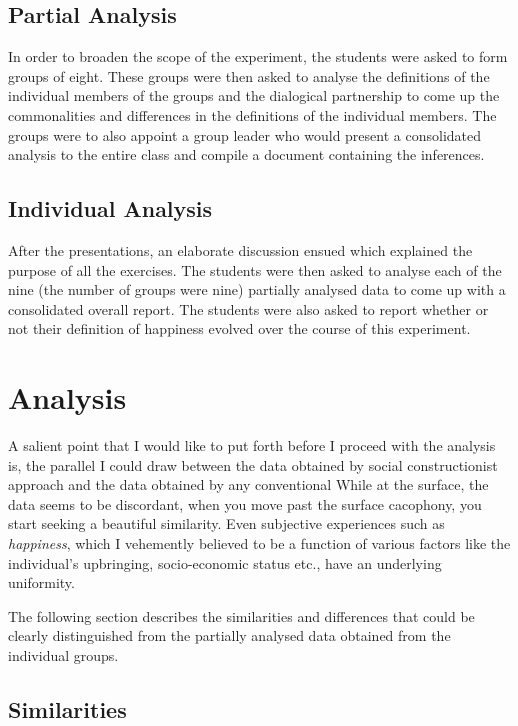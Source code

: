 \documentclass[twoside]{article}
\begin{document}
\begin{multicols}{2}
\subsection{Partial Analysis}
In order to broaden the scope of the experiment, the students were asked to form groups of eight. 
These groups were then asked to analyse the definitions of the individual members of the groups
and the dialogical partnership to come up the commonalities and differences in the definitions
of the individual members.
The groups were to also appoint a group leader who would present a consolidated analysis to the 
entire class and compile a document containing the inferences.

\subsection{Individual Analysis}
After the presentations, an elaborate discussion ensued which explained the purpose of all the
exercises. The students were then asked to analyse each of the nine (the number of groups were nine)
partially analysed data to come up with a consolidated overall report.
The students were also asked to report whether or not their definition of happiness evolved over the
course of this experiment.


\section{Analysis}
A salient point that I would like to put forth before I proceed with the analysis is, the parallel I could draw
between the data obtained by social constructionist approach and the data obtained by any conventional 
While at the surface, the data seems to be discordant, when you move past the surface cacophony, you 
start seeking a beautiful similarity.
Even subjective experiences such as \emph{happiness}, which I vehemently believed to be a function of
various factors like the individual's upbringing, socio-economic status etc., have an underlying
uniformity.

The following section describes the similarities and differences that could be clearly distinguished from
the partially analysed data obtained from the individual groups.

\subsection{Similarities}


\end{multicols}
\end{document}

